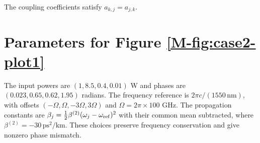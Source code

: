 \documentclass[11pt,a4paper]{article}
\begin{document}
\vspace{1em}

\noindent
The coupling coefficients satisfy $a_{k,j}=a_{j,k}$.


\section{Parameters for Figure \ref*{M-fig:case2-plot1}}
\label{app:case2-params}
The input powers are $(1,8.5,0.4,0.01)$ W and phases are $(0.023,0.65,0.62,1.95)$ radians.
The frequency reference is $2\pi c/(1550\,\mathrm{nm})$, with offsets $(-\Omega,\Omega,-3\Omega,3\Omega)$ and $\Omega=2\pi\times100$ GHz.
The propagation constants are $\beta_j=\tfrac12\beta^{(2)}(\omega_j-\omega_{\rm ref})^2$ with their common mean subtracted, where $\beta^{(2)}=-30\,\mathrm{ps}^2/\mathrm{km}$.
These choices preserve frequency conservation and give nonzero phase mismatch.
\end{document}

